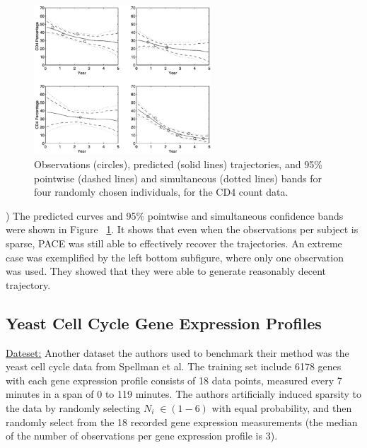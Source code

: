 \documentclass[11pt]{report}
\begin{document}
\begin{figure}
  \centering
    \includegraphics[width=0.59\textwidth]{Figures/Figure5.png}
   	\vspace{-0.5 cm}
   	\caption{Observations (circles), predicted (solid lines) trajectories, and 95\% pointwise (dashed lines) and simultaneous (dotted lines) bands for four randomly chosen individuals, for the CD4 count data.}
	\label{fig:fig5}
	\vspace{-0.7 cm}
\end{figure}

) The predicted curves and 95\% pointwise and simultaneous confidence bands were shown in Figure ~\ref{fig:fig5}.
It shows that even when the observations per subject is sparse, PACE was still able to effectively recover the trajectories. 
An extreme case was exemplified by the left bottom subfigure, where only one observation was used. 
They showed that they were able to generate reasonably decent trajectory.

\subsection*{Yeast Cell Cycle Gene Expression Profiles}
\noindent \underline{Dateset:} Another dataset the authors used to benchmark their method was the yeast cell cycle data from Spellman et al. %
The training set include 6178 genes with each gene expression profile consists of 18 data points, measured every 7 minutes in a span of 0 to 119 minutes. 
The authors artificially induced sparsity to the data by randomly selecting $N_i \; \in (1 - 6)$ with equal probability, and then randomly select from the 18 recorded gene expression measurements (the median of the number of observations per gene expression profile is 3).  %

\end{document}
